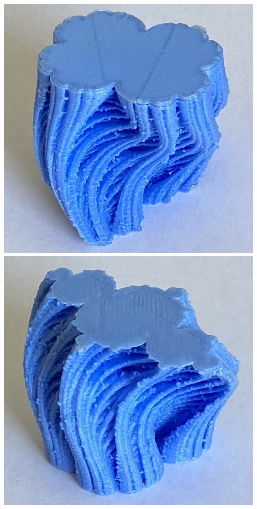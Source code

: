 \documentclass[12 pt]{article}
\begin{document}
\begin{center}
    \includegraphics[width=.4\textwidth]{images/cardioid1Cropped.jpg}\hspace{10pt}
    \includegraphics[width=.4\textwidth]{images/cardioid2cropped.jpg}
\end{center}
\end{document}
